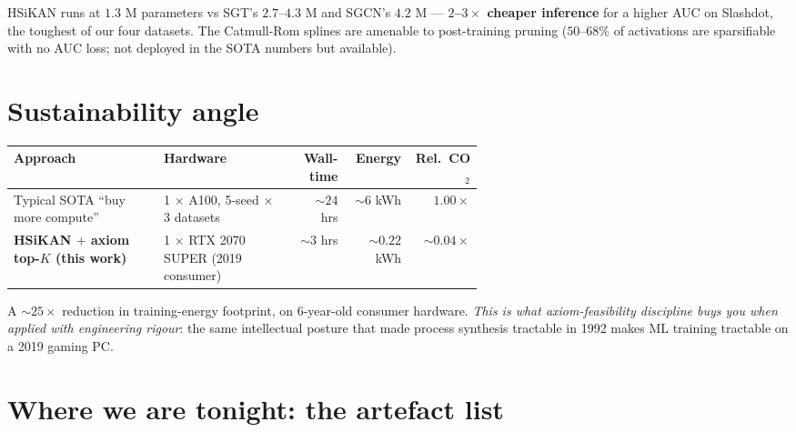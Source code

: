 \documentclass[11pt,a4paper]{article}
\theoremstyle{plain}
\theoremstyle{definition}
\begin{document}
HSiKAN runs at $1.3$ M parameters vs SGT's $2.7$–$4.3$ M and SGCN's
$4.2$ M — \textbf{$2$–$3\times$ cheaper inference} for a higher
AUC on Slashdot, the toughest of our four datasets. The Catmull-Rom
splines are amenable to post-training pruning ($50$–$68\%$ of
activations are sparsifiable with no AUC loss; not deployed in
the SOTA numbers but available).

\section{Sustainability angle}

\begin{center}\small
\begin{tabular}{p{0.32\linewidth} p{0.28\linewidth} rrr}
\toprule
Approach & Hardware & Wall-time & Energy & Rel.\ CO$_2$ \\
\midrule
Typical SOTA ``buy more compute'' & 1 $\times$ A100, 5-seed $\times$ 3 datasets & ${\sim}24$ hrs & ${\sim}6$ kWh & $1.00\times$ \\
\textbf{HSiKAN $+$ axiom top-$K$ (this work)} & 1 $\times$ RTX 2070 SUPER (2019 consumer) & ${\sim}3$ hrs & ${\sim}0.22$ kWh & $\mathbf{{\sim}0.04\times}$ \\
\bottomrule
\end{tabular}
\end{center}

A $\sim 25\times$ reduction in training-energy footprint, on
$6$-year-old consumer hardware. \emph{This is what axiom-feasibility
discipline buys you when applied with engineering rigour}: the
same intellectual posture that made process synthesis tractable
in 1992 makes ML training tractable on a 2019 gaming PC.

\section{Where we are tonight: the artefact list}
\end{document}
